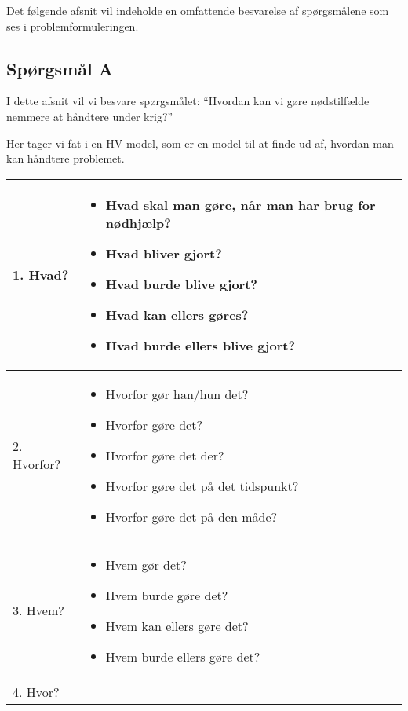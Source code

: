 Det følgende afsnit vil indeholde en omfattende besvarelse af spørgsmålene som ses i problemformuleringen.

\subsection{Spørgsmål A}
I dette afsnit vil vi besvare spørgsmålet: ``Hvordan kan vi gøre nødstilfælde nemmere at håndtere under krig?''

Her tager vi fat i en HV-model, som er en model til at finde ud af, hvordan man kan håndtere problemet.

\begin{table}[H]
    \centering
    \begin{tabular}{|p{4cm}|p{10cm}|}
        \hline
        1. Hvad? &
        \begin{itemize}
            \item Hvad skal man gøre, når man har brug for nødhjælp?
            \item Hvad bliver gjort?
            \item Hvad burde blive gjort?
            \item Hvad kan ellers gøres?
            \item Hvad burde ellers blive gjort?
        \end{itemize} \\
        \hline
        2. Hvorfor? &
        \begin{itemize}
            \item Hvorfor gør han/hun det?
            \item Hvorfor gøre det?
            \item Hvorfor gøre det der?
            \item Hvorfor gøre det på det tidspunkt?
            \item Hvorfor gøre det på den måde?
        \end{itemize} \\
        \hline
        3. Hvem? &
        \begin{itemize}
            \item Hvem gør det?
            \item Hvem burde gøre det?
            \item Hvem kan ellers gøre det?
            \item Hvem burde ellers gøre det?
        \end{itemize} \\
        \hline
        4. Hvor? &

\end{tabular}
\end{table}
